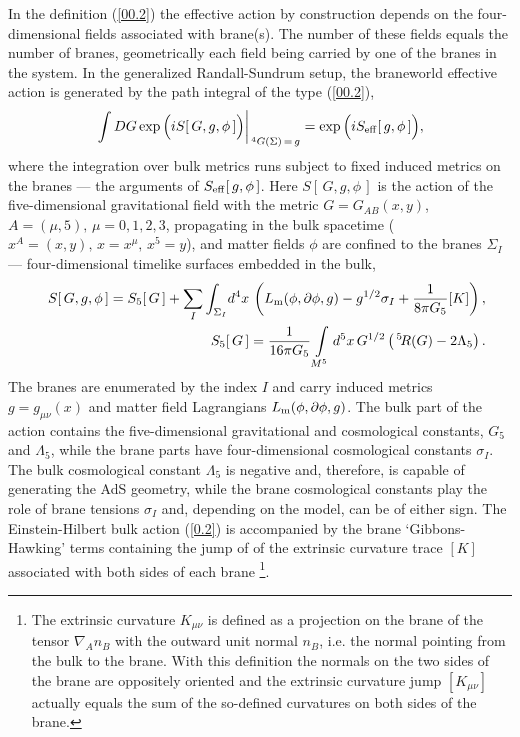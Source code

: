 \documentclass[a4paper,preprint,nofootinbib,
                 showpacs,preprintnumbers,amsmath,amssymb]{revtex4}
\begin{document}
In the definition (\ref{00.2}) the effective action 
by construction depends on the four-dimensional fields 
associated with brane(s). The number of these 
fields equals the number of branes, geometrically each field being 
carried by one of the branes in the system. In the generalized 
Randall-Sundrum setup, the braneworld effective action is 
generated by the path integral of the type (\ref{00.2}), 
     \begin{eqnarray} 
     \left.\int DG \exp\Big(iS[\,G,g,\phi\,]\Big) 
     \right|_{\,\vphantom{I}^4G(\Sigma)\,=\,g}= 
     \exp\Big(iS_{\rm eff}[\,g,\phi\,]\Big),        \label{0.3} 
     \end{eqnarray} 
where the integration over bulk metrics runs subject to fixed 
induced metrics on the branes --- the arguments of $S_{\rm 
eff}[\,g,\phi\,]$. Here $S[\,G,g,\phi\,]$ is the action of the 
five-dimensional gravitational field with the metric 
$G=G_{AB}(x,y)$, $A=(\mu,5),\,\mu=0,1,2,3$, propagating in the 
bulk spacetime ($x^A=(x,y),\,x=x^\mu,\,x^5=y$), and matter fields 
$\phi$ are confined to the branes $\Sigma_I$ --- four-dimensional 
timelike surfaces embedded in the bulk, 
     \begin{eqnarray} 
     &&S[\,G,g,\phi\,]=S_5[\,G\,] 
     +\sum\limits_{I}\int_{\Sigma_I}\! 
     d^4x\,\left(L_{\rm m}(\phi,\partial\phi,g) 
     -g^{1/2}\sigma_I+\frac1{8\pi G_5}[K]\right), \label{0.1}\\ 
     &&S_5[\,G\,]=\frac1{16\pi G_5} 
     \int\limits_{M^5} d^5x\,G^{1/2} 
     \left(\,\vphantom{I}^5\!R(G)-2\Lambda_5\right).  \label{0.2} 
     \end{eqnarray} 
The branes are enumerated by the index $I$ and carry induced metrics 
$g=g_{\mu\nu}(x)$ and matter field Lagrangians 
$L_{\rm m}(\phi,\partial\phi,g)$. The bulk part of the action contains 
the five-dimensional gravitational and cosmological constants, $G_5$ and 
$\Lambda_5$, while the brane parts have four-dimensional cosmological 
constants $\sigma_I$. The bulk cosmological constant $\Lambda_5$ is negative 
and, therefore, is capable of generating the AdS geometry, while 
the brane cosmological constants play the role of brane tensions 
$\sigma_I$ and, depending on the model, can be of either sign. The 
Einstein-Hilbert bulk action (\ref{0.2}) is accompanied by the 
brane `Gibbons-Hawking' terms containing the jump of of the 
extrinsic curvature trace $[K]$ associated with both sides of each brane 
\cite{ReallGH}\footnote{The extrinsic curvature $K_{\mu\nu}$ is 
defined as a projection on the brane of the tensor $\nabla_A n_B$ 
with the outward unit normal $n_B$, i.e. the normal pointing from 
the bulk to the brane. With this definition the normals on the two 
sides of the brane are oppositely oriented and the extrinsic 
curvature jump $[K_{\mu\nu}]$ actually equals the sum of the 
so-defined curvatures on both sides of the brane.}. 
 
\end{document}
